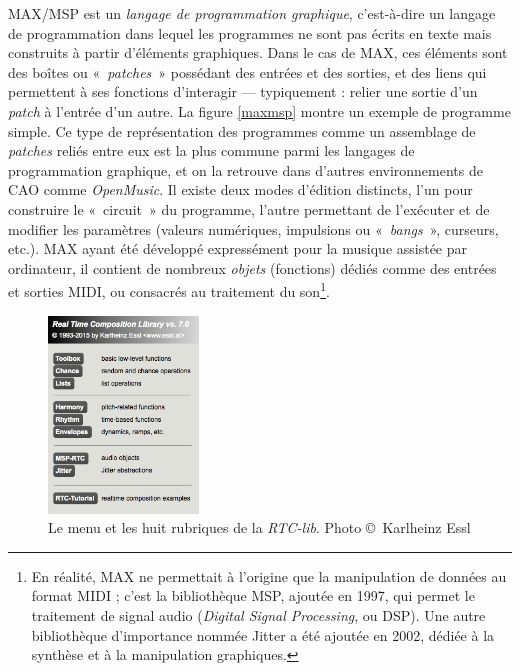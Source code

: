 \documentclass[a4paper,12pt]{article}
\newcommand{\guill}[1]{«~#1~»}
\begin{document}
MAX/MSP est un \emph{langage de programmation graphique}, c'est-à-dire un langage de programmation dans lequel les programmes ne sont pas écrits en texte mais construits à partir d'éléments graphiques. Dans le cas de MAX, ces éléments sont des boîtes ou \guill{\emph{patches}} possédant des entrées et des sorties, et des liens qui permettent à ses fonctions d'interagir --- typiquement : relier une sortie d'un \emph{patch} à l'entrée d'un autre. La figure \ref{maxmsp} montre un exemple de programme simple. Ce type de représentation des programmes comme un assemblage de \emph{patches} reliés entre eux est la plus commune parmi les langages de programmation graphique, et on la retrouve dans d'autres environnements de CAO comme \emph{OpenMusic}. Il existe deux modes d'édition distincts, l'un pour construire le \guill{circuit} du programme, l'autre permettant de l'exécuter et de modifier les paramètres (valeurs numériques, impulsions ou \guill{\emph{bangs}}, curseurs, etc.). MAX ayant été développé expressément pour la musique assistée par ordinateur, il contient de nombreux \emph{objets} (fonctions) dédiés comme des entrées et sorties MIDI, ou consacrés au traitement du son\footnote{En réalité, MAX ne permettait à l'origine que la manipulation de données au format MIDI ; c'est la bibliothèque MSP, ajoutée en 1997, qui permet le traitement de signal audio (\emph{Digital Signal Processing}, ou DSP). Une autre bibliothèque d'importance nommée Jitter a été ajoutée en 2002, dédiée à la synthèse et à la manipulation graphiques.}.

\begin{figure}[!h]
\begin{center}
\includegraphics[width=4cm]{images/rtcmenu.png}
\caption{\footnotesize Le menu et les huit rubriques de la \emph{RTC-lib}. Photo \copyright~Karlheinz Essl}
\label{rtcmenu}
\end{center}
\end{figure}
\end{document}
